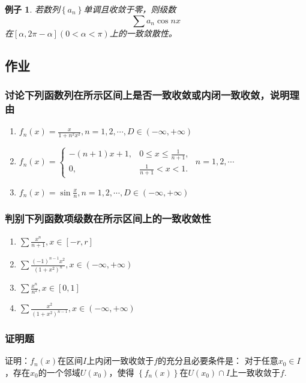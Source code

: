 \documentclass[a4paper,12pt]{article}
\newtheorem{example}{例子}
\begin{document}
\begin{example}
    若数列$\displaystyle \left\{a_n\right\}$单调且收敛于零，则级数
    \[
        \sum a_n \cos nx
        \]
    在$[\alpha, 2\pi-\alpha](0 < \alpha < \pi)$上的一致敛散性。
\end{example}

\subsection{作业}
\subsubsection{讨论下列函数列在所示区间上是否一致收敛或内闭一致收敛，说明理由}
\begin{enumerate}[label={\rm(\arabic*)}]
    \item $\displaystyle f_n(x) = \frac{x}{1 + n^2x^2}, n = 1,2, \cdots, D \in (-\infty, +\infty)$
    \item $\displaystyle f_n(x) = \left\{\begin{array}{cl} 
             -(n+1)x+1, & 0 \le x \le \frac{1}{n+1}, \\
             0        , & \frac{1}{n+1} < x <1. 
            \end{array} \right.$
          $\displaystyle n = 1,2, \cdots$
      \item $\displaystyle f_n(x) = \sin \frac{x}{n}, n = 1, 2, \cdots,
          D \in \left(-\infty, +\infty\right)$
\end{enumerate}

\subsubsection{判别下列函数项级数在所示区间上的一致收敛性}
\begin{enumerate}[label={\rm(\arabic*)}]
    \item $\displaystyle \sum \frac{x^n}{n+1}, x \in [-r, r]$
    \item $\displaystyle \sum \frac{(-1)^{n-1}x^2}{(1+x^2)^n}, x \in 
        \left(-\infty, +\infty\right)$
    \item $\displaystyle \sum \frac{x^n}{n^2}, x \in [0,1]$
    \item $\displaystyle \sum \frac{x^2}{(1+x^2)^{n-1}}, x \in 
        \left(-\infty, +\infty\right)$
\end{enumerate}
\subsubsection{证明题}
证明：$\displaystyle f_n(x)$在区间$I$上内闭一致收敛于$f$的充分且必要条件是：
对于任意$x_0 \in I$，存在$x_0$的一个邻域$\displaystyle U(x_0)$，使得
$\displaystyle \left\{f_n(x)\right\}$在$\displaystyle U(x_0) \cap I$上一致收敛于$f$.
\end{document}
